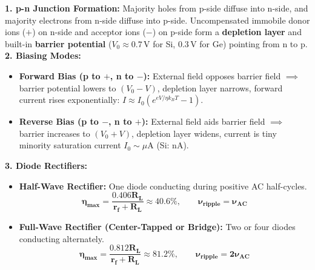 \documentclass[10pt,twoside,openright]{book}
\begin{document}
\begin{formulabox}
\textbf{1. p-n Junction Formation:}
Majority holes from p-side diffuse into n-side, and majority electrons from n-side diffuse into p-side.
Uncompensated immobile donor ions ($+$) on n-side and acceptor ions ($-$) on p-side form a \textbf{depletion layer} and built-in \textbf{barrier potential} ($V_0 \approx 0.7\,\mathrm{V}$ for Si, $0.3\,\mathrm{V}$ for Ge) pointing from n to p.
\textbf{2. Biasing Modes:}
\begin{itemize}
  \item \textbf{Forward Bias (p to $+$, n to $-$):} External field opposes barrier field $\implies$ barrier potential lowers to $(V_0 - V)$, depletion layer narrows, forward current rises exponentially: $I \approx I_0 (e^{eV/\eta k_B T} - 1)$.
  \item \textbf{Reverse Bias (p to $-$, n to $+$):} External field aids barrier field $\implies$ barrier increases to $(V_0 + V)$, depletion layer widens, current is tiny minority saturation current $I_0 \sim \mu\mathrm{A}$ (Si: $\mathrm{nA}$).
\end{itemize}
\textbf{3. Diode Rectifiers:}
\begin{itemize}
  \item \textbf{Half-Wave Rectifier:} One diode conducting during positive AC half-cycles.
  \begin{equation}
    \mathbf{\eta_{\max} = \frac{0.406 R_L}{r_f + R_L} \approx 40.6\%}, \qquad \mathbf{\nu_{\text{ripple}} = \nu_{\text{AC}}}
  \end{equation}
  \item \textbf{Full-Wave Rectifier (Center-Tapped or Bridge):} Two or four diodes conducting alternately.
  \begin{equation}
    \mathbf{\eta_{\max} = \frac{0.812 R_L}{r_f + R_L} \approx 81.2\%}, \qquad \mathbf{\nu_{\text{ripple}} = 2\nu_{\text{AC}}}
  \end{equation}
\end{itemize}
\end{formulabox}
\end{document}
